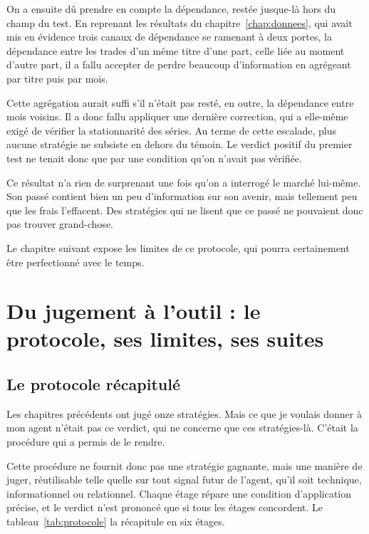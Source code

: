 On a ensuite dû prendre en compte la dépendance, restée jusque-là hors du
champ du test. En reprenant les résultats du chapitre~\ref{chap:donnees}, qui
avait mis en évidence trois canaux de dépendance se ramenant à deux portes,
la dépendance entre les trades d'un même titre d'une part, celle liée au
moment d'autre part, il a fallu accepter de perdre beaucoup d'information en
agrégeant par titre puis par mois.

Cette agrégation aurait suffi s'il n'était pas resté, en outre, la dépendance
entre mois voisins. Il a donc fallu appliquer une dernière correction, qui a
elle-même exigé de vérifier la stationnarité des séries. Au terme de cette
escalade, plus aucune stratégie ne subsiste en dehors du témoin. Le verdict
positif du premier test ne tenait donc que par une condition qu'on n'avait pas
vérifiée.

Ce résultat n'a rien de surprenant une fois qu'on a interrogé le marché
lui-même. Son passé contient bien un peu d'information sur son avenir, mais
tellement peu que les frais l'effacent. Des stratégies qui ne lisent que ce
passé ne pouvaient donc pas trouver grand-chose.

Le chapitre suivant expose les limites de ce protocole, qui pourra certainement
être perfectionné avec le temps.
\chapter{Du jugement à l'outil : le protocole, ses limites, ses suites}
\label{chap:protocole}

\section{Le protocole récapitulé}
\label{sec:protocole}

Les chapitres précédents ont jugé onze stratégies. Mais ce que je voulais
donner à mon agent n'était pas ce verdict, qui ne concerne que ces
stratégies-là. C'était la procédure qui a permis de le rendre.

Cette procédure ne fournit donc pas une stratégie gagnante, mais une manière
de juger, réutilisable telle quelle sur tout signal futur de l'agent, qu'il
soit technique, informationnel ou relationnel. Chaque étage répare une
condition d'application précise, et le verdict n'est prononcé que si tous les
étages concordent. Le tableau~\ref{tab:protocole} la récapitule en six étages.

